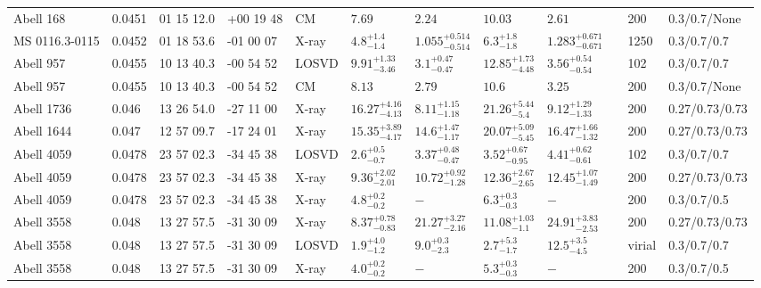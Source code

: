\begin{landscape}
\begin{center}
{\begin{longtable}{llllllllllll}
Abell 168 & 0.0451 & 01 15 12.0 & +00 19 48 & CM & ${7.69}^{}_{}$ & ${2.24}^{}_{}$ & ${10.03}^{}_{}$ & ${2.61}^{}_{}$ & \citet{RI06.1} & 200 & 0.3/0.7/None \\
MS 0116.3-0115 & 0.0452 & 01 18 53.6 & -01 00 07 & X-ray & ${4.8}^{+1.4}_{-1.4}$ & ${1.055}^{+0.514}_{-0.514}$ & ${6.3}^{+1.8}_{-1.8}$ & ${1.283}^{+0.671}_{-0.671}$ & \citet{GA06.1} & 1250 & 0.3/0.7/0.7 \\
Abell 957 & 0.0455 & 10 13 40.3 & -00 54 52 & LOSVD & ${9.91}^{+1.33}_{-3.46}$ & ${3.1}^{+0.47}_{-0.47}$ & ${12.85}^{+1.73}_{-4.48}$ & ${3.56}^{+0.54}_{-0.54}$ & \citet{WO10.1} & 102 & 0.3/0.7/0.7 \\
Abell 957 & 0.0455 & 10 13 40.3 & -00 54 52 & CM & ${8.13}^{}_{}$ & ${2.79}^{}_{}$ & ${10.6}^{}_{}$ & ${3.25}^{}_{}$ & \citet{RI06.1} & 200 & 0.3/0.7/None \\
Abell 1736 & 0.046 & 13 26 54.0 & -27 11 00 & X-ray & ${16.27}^{+4.16}_{-4.13}$ & ${8.11}^{+1.15}_{-1.18}$ & ${21.26}^{+5.44}_{-5.4}$ & ${9.12}^{+1.29}_{-1.33}$ & \citet{BA14.1} & 200 & 0.27/0.73/0.73 \\
Abell 1644 & 0.047 & 12 57 09.7 & -17 24 01 & X-ray & ${15.35}^{+3.89}_{-4.17}$ & ${14.6}^{+1.47}_{-1.17}$ & ${20.07}^{+5.09}_{-5.45}$ & ${16.47}^{+1.66}_{-1.32}$ & \citet{BA14.1} & 200 & 0.27/0.73/0.73 \\
Abell 4059 & 0.0478 & 23 57 02.3 & -34 45 38 & LOSVD & ${2.6}^{+0.5}_{-0.7}$ & ${3.37}^{+0.48}_{-0.47}$ & ${3.52}^{+0.67}_{-0.95}$ & ${4.41}^{+0.62}_{-0.61}$ & \citet{WO10.1} & 102 & 0.3/0.7/0.7 \\
Abell 4059 & 0.0478 & 23 57 02.3 & -34 45 38 & X-ray & ${9.36}^{+2.02}_{-2.01}$ & ${10.72}^{+0.92}_{-1.28}$ & ${12.36}^{+2.67}_{-2.65}$ & ${12.45}^{+1.07}_{-1.49}$ & \citet{BA14.1} & 200 & 0.27/0.73/0.73 \\
Abell 4059 & 0.0478 & 23 57 02.3 & -34 45 38 & X-ray & ${4.8}^{+0.2}_{-0.2}$ & ${-}^{}_{}$ & ${6.3}^{+0.3}_{-0.3}$ & ${-}^{}_{}$ & \citet{XU01.1} & 200 & 0.3/0.7/0.5 \\
Abell 3558 & 0.048 & 13 27 57.5 & -31 30 09 & X-ray & ${8.37}^{+0.78}_{-0.83}$ & ${21.27}^{+3.27}_{-2.16}$ & ${11.08}^{+1.03}_{-1.1}$ & ${24.91}^{+3.83}_{-2.53}$ & \citet{BA14.1} & 200 & 0.27/0.73/0.73 \\
Abell 3558 & 0.048 & 13 27 57.5 & -31 30 09 & LOSVD & ${1.9}^{+4.0}_{-1.2}$ & ${9.0}^{+0.3}_{-2.3}$ & ${2.7}^{+5.3}_{-1.7}$ & ${12.5}^{+3.5}_{-4.5}$ & \citet{LO06.1} & virial & 0.3/0.7/0.7 \\
Abell 3558 & 0.048 & 13 27 57.5 & -31 30 09 & X-ray & ${4.0}^{+0.2}_{-0.2}$ & ${-}^{}_{}$ & ${5.3}^{+0.3}_{-0.3}$ & ${-}^{}_{}$ & \citet{XU01.1} & 200 & 0.3/0.7/0.5 \\

\end{longtable}}
\end{center}
\end{landscape}
